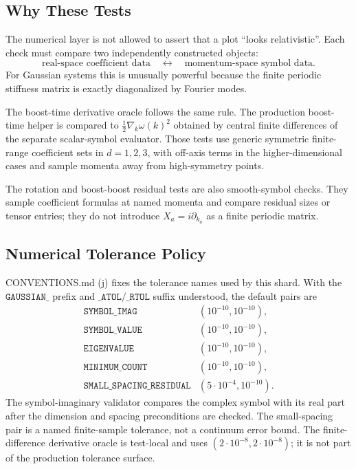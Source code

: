 \subsection{Why These Tests}

The numerical layer is not allowed to assert that a plot ``looks relativistic''.
Each check must compare two independently constructed objects:
\[
  \text{real-space coefficient data}
  \quad\longleftrightarrow\quad
  \text{momentum-space symbol data}.
\]
For Gaussian systems this is unusually powerful because the finite periodic
stiffness matrix is exactly diagonalized by Fourier modes.

The boost-time derivative oracle follows the same rule.  The production
boost-time helper is compared to \(\frac12\nabla_k\omega(k)^2\) obtained by
central finite differences of the separate scalar-symbol evaluator.  Those
tests use generic symmetric finite-range coefficient sets in \(d=1,2,3\), with
off-axis terms in the higher-dimensional cases and sample momenta away from
high-symmetry points.

The rotation and boost-boost residual tests are also smooth-symbol checks.  They
sample coefficient formulas at named momenta and compare residual sizes or
tensor entries; they do not introduce \(X_a=i\partial_{k_a}\) as a finite
periodic matrix.

\subsection{Numerical Tolerance Policy}

CONVENTIONS.md (j) fixes the tolerance names used by this shard.  With the
\(\texttt{GAUSSIAN\_}\) prefix and \(\texttt{\_ATOL}/\texttt{\_RTOL}\) suffix
understood, the default pairs are
\[
\begin{array}{ll}
\texttt{SYMBOL\_IMAG} & (10^{-10},10^{-10}),\\
\texttt{SYMBOL\_VALUE} & (10^{-10},10^{-10}),\\
\texttt{EIGENVALUE} & (10^{-10},10^{-10}),\\
\texttt{MINIMUM\_COUNT} & (10^{-10},10^{-10}),\\
\texttt{SMALL\_SPACING\_RESIDUAL} & (5\cdot10^{-4},10^{-10}).
\end{array}
\]
The symbol-imaginary validator compares the complex symbol with its real part
after the dimension and spacing preconditions are checked.  The small-spacing
pair is a named finite-sample tolerance, not a continuum error bound.
The finite-difference derivative oracle is test-local and uses
\((2\cdot10^{-8},2\cdot10^{-8})\); it is not part of the production tolerance
surface.

